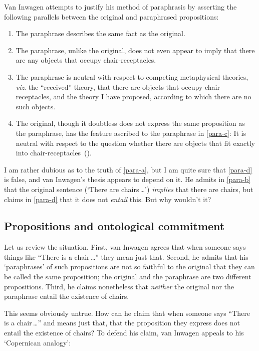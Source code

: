 \documentclass[11pt]{article}
\begin{document}
\begin{spacing}{1.5}
Van Inwagen attempts to justify his method of paraphrasis by asserting
the following parallels between the original and paraphrased
propositions:
\begin{enumerate}[label=(\Alph*)]
	\item The paraphrase describes the same fact as the
          original.  \label{para-a}
	\item The paraphrase, unlike the original, does not even
          appear to imply that there are any objects that occupy
          chair-receptacles.  \label{para-b}
	\item The paraphrase is neutral with respect to competing
          metaphysical theories, {\em viz}.  the ``received'' theory,
          that there are objects that occupy chair-receptacles, and
          the theory I have proposed, according to which there are no
          such objects.  \label{para-c}
	\item The original, though it doubtless does not express the
          same proposition as the paraphrase, has the feature ascribed
          to the paraphrase in \ref{para-c}: It is neutral with
          respect to the question whether there are objects that fit
          exactly into
          chair-receptacles~(\citeyear[113]{inwagen1995}).  \label{para-d}
\end{enumerate}

I am rather dubious as to the truth of \ref{para-a}, but I am quite
sure that \ref{para-d} is false, and van Inwagen's thesis appears to
depend on it.  He admits in \ref{para-b} that the original sentence
(`There are chairs\,\ldots ') {\em implies} that there are chairs, but
claims in \ref{para-d} that it does not {\em entail} this.  But why
wouldn't it?

\subsection{Propositions and ontological commitment}
\label{prop-ont}
Let us review the situation.  First, van Inwagen agrees that when
someone says things like ``There is a chair\,\ldots '' they mean just
that.  Second, he admits that his `paraphrases' of such propositions
are not so faithful to the original that they can be called the same
proposition; the original and the paraphrase are two different
propositions.  Third, he claims nonetheless that {\em neither} the
original nor the paraphrase entail the existence of chairs.

This seems obviously untrue.  How can he claim that when someone says
``There is a chair\,\ldots '' and means just that, that the
proposition they express does not entail the existence of chairs?  To
defend his claim, van Inwagen appeals to his `Copernican analogy':


\end{spacing}
\end{document}
